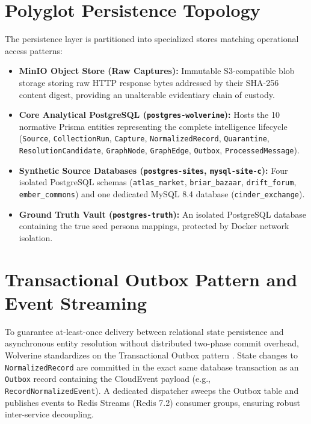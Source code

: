 \section{Polyglot Persistence Topology}
\label{sec:persistence_tiers}

The persistence layer is partitioned into specialized stores matching operational access patterns:

\begin{itemize}
    \item \textbf{MinIO Object Store (Raw Captures):} Immutable S3-compatible blob storage storing raw HTTP response bytes addressed by their SHA-256 content digest, providing an unalterable evidentiary chain of custody.
    \item \textbf{Core Analytical PostgreSQL (\texttt{postgres-wolverine}):} Hosts the 10 normative Prisma entities representing the complete intelligence lifecycle (\texttt{Source}, \texttt{CollectionRun}, \texttt{Capture}, \texttt{NormalizedRecord}, \texttt{Quarantine}, \texttt{ResolutionCandidate}, \texttt{GraphNode}, \texttt{GraphEdge}, \texttt{Outbox}, \texttt{ProcessedMessage}).
    \item \textbf{Synthetic Source Databases (\texttt{postgres-sites}, \texttt{mysql-site-c}):} Four isolated PostgreSQL schemas (\texttt{atlas\_market}, \texttt{briar\_bazaar}, \texttt{drift\_forum}, \texttt{ember\_commons}) and one dedicated MySQL 8.4 database (\texttt{cinder\_exchange}).
    \item \textbf{Ground Truth Vault (\texttt{postgres-truth}):} An isolated PostgreSQL database containing the true seed persona mappings, protected by Docker network isolation.
\end{itemize}

\section{Transactional Outbox Pattern and Event Streaming}
\label{sec:outbox_pattern}

To guarantee at-least-once delivery between relational state persistence and asynchronous entity resolution without distributed two-phase commit overhead, Wolverine standardizes on the Transactional Outbox pattern \cite{kleppmann2017designing}. State changes to \texttt{NormalizedRecord} are committed in the exact same database transaction as an \texttt{Outbox} record containing the CloudEvent payload (e.g., \texttt{RecordNormalizedEvent}). A dedicated dispatcher sweeps the Outbox table and publishes events to Redis Streams (Redis 7.2) consumer groups, ensuring robust inter-service decoupling.

